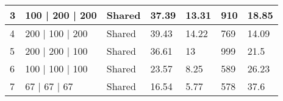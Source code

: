 \begin{table}[h!]
{\begin{tabular}{|l|l|l|l|l|l|l|}
3                      & 100 | 200 | 200                                                                                 & Shared                             & 37.39                                                                                          & 13.31                                                                                                  & 910                                                                                                                                               & 18.85                                                                          \\ \hline
4                      & 200 | 100 | 200                                                                                 & Shared                             & 39.43                                                                                          & 14.22                                                                                                  & 769                                                                                                                                               & 14.09                                                                          \\ \hline
5                      & 200 | 200 | 100                                                                                 & Shared                             & 36.61                                                                                          & 13                                                                                                     & 999                                                                                                                                               & 21.5                                                                           \\ \hline
6                      & 100 | 100 | 100                                                                                 & Shared                             & 23.57                                                                                          & 8.25                                                                                                   & 589                                                                                                                                               & 26.23                                                                          \\ \hline
7                      & 67 | 67 | 67                                                                                    & Shared                             & 16.54                                                                                          & 5.77                                                                                                   & 578                                                                                                                                               & 37.6                                                                           \\ \hline

\end{tabular}}
\end{table}

